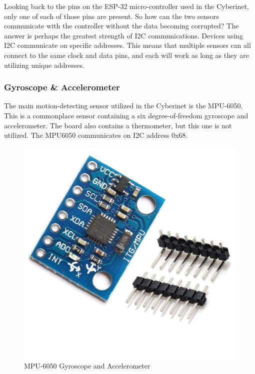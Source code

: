 Looking back to the pins on the ESP-32 micro-controller used in the Cyberinet, only one of each of those pins are present. So how can the two sensors communicate with the controller without the data becoming corrupted? The answer is perhaps the greatest strength of I2C communications. Devices using I2C communicate on specific addresses. This means that multiple sensors can all connect to the same clock and data pins, and each will work as long as they are utilizing unique addresses. 


\subsubsection{Gyroscope \& Accelerometer}

The main motion-detecting sensor utilized in the Cyberinet is the MPU-6050. This is a commonplace sensor containing a six degree-of-freedom gyroscope and accelerometer. The board also contains a thermometer, but this one is not utilized. 
The MPU6050 communicates on I2C address 0x68.

\begin{center}
    \begin{figure}
        \centering
        \includegraphics[scale=0.2]{diagrams/oem/6050.jpg}
        \caption{MPU-6050 Gyroscope and Accelerometer}
        \label{fig:6050}
    \end{figure}
\end{center}


